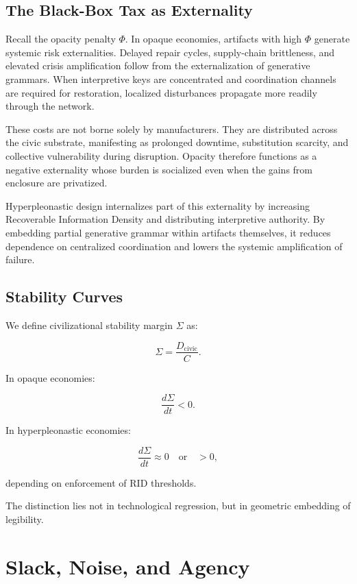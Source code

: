 \documentclass[11pt]{article}
\begin{document}
\subsection{The Black-Box Tax as Externality}

Recall the opacity penalty $\Phi$. In opaque economies, artifacts with
high $\Phi$ generate systemic risk externalities. Delayed repair cycles,
supply-chain brittleness, and elevated crisis amplification follow from
the externalization of generative grammars. When interpretive keys are
concentrated and coordination channels are required for restoration,
localized disturbances propagate more readily through the network.

These costs are not borne solely by manufacturers. They are distributed
across the civic substrate, manifesting as prolonged downtime,
substitution scarcity, and collective vulnerability during disruption.
Opacity therefore functions as a negative externality whose burden is
socialized even when the gains from enclosure are privatized.

Hyperpleonastic design internalizes part of this externality by
increasing Recoverable Information Density and distributing interpretive
authority. By embedding partial generative grammar within artifacts
themselves, it reduces dependence on centralized coordination and lowers
the systemic amplification of failure.

\subsection{Stability Curves}

We define civilizational stability margin $\Sigma$ as:

\[
\Sigma = \frac{D_{\text{civic}}}{C}.
\]

In opaque economies:

\[
\frac{d\Sigma}{dt} < 0.
\]

In hyperpleonastic economies:

\[
\frac{d\Sigma}{dt} \approx 0 \quad \text{or} \quad > 0,
\]

depending on enforcement of RID thresholds.

The distinction lies not in technological regression,
but in geometric embedding of legibility.

\section{Slack, Noise, and Agency}
\end{document}

